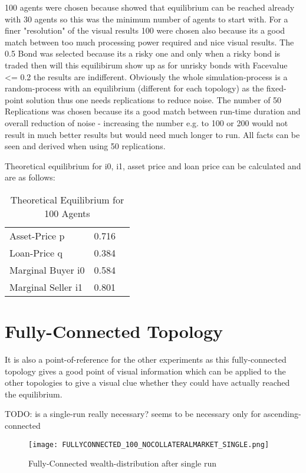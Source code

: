 \documentclass[Bachelorarbeit.tex]{subfiles}
\begin{document}
100 agents were chosen because \cite{Breuer2015} showed that equilibrium can be reached already with 30 agents so this was the minimum number of agents to start with. For a finer "resolution" of the visual results 100 were chosen also because its a good match between too much processing power required and nice visual results.
The 0.5 Bond was selected because its a risky one and only when a risky bond is traded then will this equilibirum show up as for unrisky bonds with Facevalue <= 0.2 the results are indifferent.
Obviously the whole simulation-process is a random-process with an equilibrium (different for each topology) as the fixed-point solution thus one needs replications to reduce noise. The number of 50 Replications was chosen because its a good match between run-time duration and overall reduction of noise - increasing the number e.g. to 100 or 200 would not result in much better results but would need much longer to run. All facts can be seen and derived when using 50 replications.

Theoretical equilibrium for i0, i1, asset price and loan price can be calculated and are as follows:

\begin{table}[h]
	\centering
	\caption{Theoretical Equilibrium for 100 Agents}
	\begin{tabular} { l c r }
		\hline
		Asset-Price p & 0.716 \\
		Loan-Price q & 0.384 \\
		Marginal Buyer i0 & 0.584 \\
		Marginal Seller i1 & 0.801 \\
		\hline
	\end{tabular}
\end{table}





\section{Fully-Connected Topology}
It is also a point-of-reference for the other experiments as this fully-connected topology gives a good point of visual information which can be applied to the other topologies to give a visual clue whether they could have actually reached the equilibrium.

TODO: is a single-run really necessary? seems to be necessary only for ascending-connected 

\begin{figure}[!htbp]
	\centering
  \texttt{[image: FULLYCONNECTED\_100\_NOCOLLATERALMARKET\_SINGLE.png]}
	\caption{Fully-Connected wealth-distribution after single run}
	\label{fig1}
\end{figure}
\end{document}
